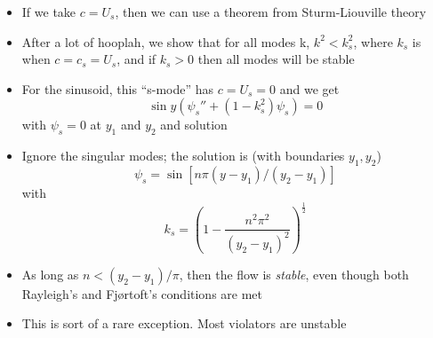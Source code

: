 \documentclass[landscape]{seminar}
\begin{document}
\begin{slide}

\begin{itemize}
  \item If we take $c = U_s$, then we can use a theorem from Sturm-Liouville theory

  \item After a lot of hooplah, we show that for all modes k, $k^2 < k_s^2$, where $k_s$ is when $c = c_s = U_s$, and if $k_s > 0$ then all modes will be stable

  \item For the sinusoid, this ``s-mode'' has $c = U_s = 0$ and we get
\begin{equation*}
\sin y \left(\psi_s'' + (1 - k_s^2) \psi_s \right) = 0
\end{equation*}
with $\psi_s = 0$ at $y_1$ and $y_2$ and solution

\end{itemize}

\end{slide}
\begin{slide}

\begin{itemize}
  \item Ignore the singular modes; the solution is (with boundaries $y_1, y_2$)
\begin{equation*}
\psi_s = \sin\left[n \pi (y - y_1) / (y_2 - y_1)\right]
\end{equation*}
with
\begin{equation*}
k_s = \left(1 - \frac{n^2 \pi^2}{(y_2 - y_1)^2} \right)^{\frac{1}{2}}
\end{equation*}

\item As long as $n < (y_2 - y_1) / \pi$, then the flow is \emph{stable}, even though both Rayleigh's and Fj\o rtoft's conditions are met

\item This is sort of a rare exception. Most violators are unstable

\end{itemize}

\end{slide}
\end{document}
